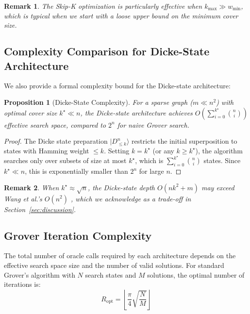 \documentclass{ieeeaccess}
\newtheorem{prop}{Proposition}
\newenvironment{prf}{\begin{proof}}{\end{proof}}
\newtheorem{rem}{Remark}
\begin{document}
\begin{rem}
\label{rem:skipk-effective}
The Skip-K optimization is particularly effective when
$k_{\max} \gg w_{\min}$, which is typical when we start
with a loose upper bound on the minimum cover size.
\end{rem}

\subsection{Complexity Comparison for Dicke-State Architecture}

We also provide a formal complexity bound for the Dicke-state
architecture:

\begin{prop}[Dicke-State Complexity]
\label{theo:dicke_complexity}
For a sparse graph ($m \ll n^2$) with optimal cover size
$k^\star \ll n$, the Dicke-state architecture achieves
$O\!\left(\sum_{i=0}^{k^\star}\binom{n}{i}\right)$ effective
search space, compared to $2^n$ for naive Grover search.
\end{prop}

\begin{prf}
The Dicke state preparation $|D_{\leq k}^n\rangle$ restricts
the initial superposition to states with Hamming weight
$\leq k$. Setting $k = k^\star$ (or any $k \geq k^\star$),
the algorithm searches only over subsets of size at most
$k^\star$, which is $\sum_{i=0}^{k^\star}\binom{n}{i}$
states. Since $k^\star \ll n$, this is exponentially smaller
than $2^n$ for large $n$.
\end{prf}

\begin{rem}
\label{rem:dicke-depth-tradeoff}
When $k^\star \approx \sqrt{n}$, the Dicke-state depth
$O(nk^2 + m)$ may exceed Wang et al.'s $O(n^2)$
\cite{wang_quantum_2023}, which we acknowledge as a
trade-off in Section~\ref{sec:discussion}.
\end{rem}

\subsection{Grover Iteration Complexity}
\label{sec:grover_iterations}

The total number of oracle calls required by each architecture
depends on the effective search space size and the number of
valid solutions. For standard Grover's algorithm with $N$
search states and $M$ solutions, the optimal number of
iterations is:
\begin{equation}
    R_{\mathrm{opt}}
    = \left\lfloor
        \frac{\pi}{4} \sqrt{\frac{N}{M}}
      \right\rfloor
    \label{eq:grover-optimal}
\end{equation}
\end{document}
